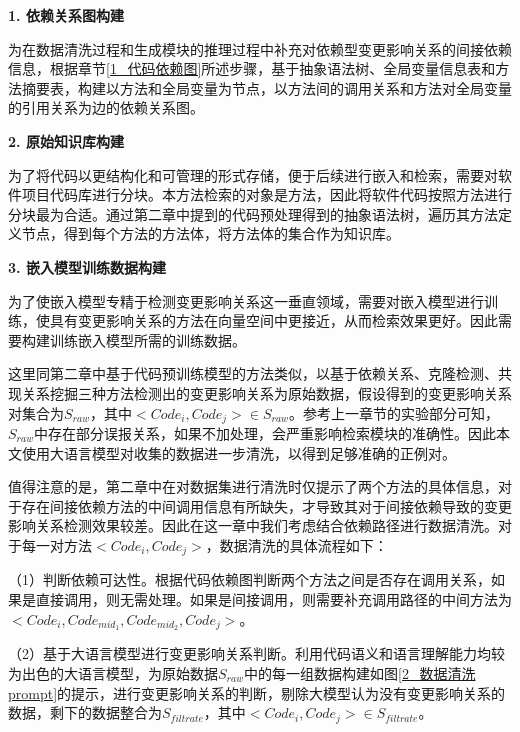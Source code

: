 \noindent \textbf{1. 依赖关系图构建}

为在数据清洗过程和生成模块的推理过程中补充对依赖型变更影响关系的间接依赖信息，根据章节\ref{1_代码依赖图}所述步骤，基于抽象语法树、全局变量信息表和方法摘要表，构建以方法和全局变量为节点，以方法间的调用关系和方法对全局变量的引用关系为边的依赖关系图。

\noindent \textbf{2. 原始知识库构建}

为了将代码以更结构化和可管理的形式存储，便于后续进行嵌入和检索，需要对软件项目代码库进行分块。本方法检索的对象是方法，因此将软件代码按照方法进行分块最为合适。通过第二章中提到的代码预处理得到的抽象语法树，遍历其方法定义节点，得到每个方法的方法体，将方法体的集合作为知识库。

\noindent \textbf{3. 嵌入模型训练数据构建}

为了使嵌入模型专精于检测变更影响关系这一垂直领域，需要对嵌入模型进行训练，使具有变更影响关系的方法在向量空间中更接近，从而检索效果更好。因此需要构建训练嵌入模型所需的训练数据。

这里同第二章中基于代码预训练模型的方法类似，以基于依赖关系、克隆检测、共现关系挖掘三种方法检测出的变更影响关系为原始数据，假设得到的变更影响关系对集合为$S_{raw}$，其中$<Code_i,Code_j>\in S_{raw}$。参考上一章节的实验部分可知，$S_{raw}$中存在部分误报关系，如果不加处理，会严重影响检索模块的准确性。因此本文使用大语言模型对收集的数据进一步清洗，以得到足够准确的正例对。

值得注意的是，第二章中在对数据集进行清洗时仅提示了两个方法的具体信息，对于存在间接依赖方法的中间调用信息有所缺失，才导致其对于间接依赖导致的变更影响关系检测效果较差。因此在这一章中我们考虑结合依赖路径进行数据清洗。对于每一对方法$<Code_i,Code_j>$，数据清洗的具体流程如下：


（1）判断依赖可达性。根据代码依赖图判断两个方法之间是否存在调用关系，如果是直接调用，则无需处理。如果是间接调用，则需要补充调用路径的中间方法为$<Code_i,Code_{mid_1},Code_{mid_2},Code_j>$。

（2）基于大语言模型进行变更影响关系判断。利用代码语义和语言理解能力均较为出色的大语言模型，为原始数据$S_{raw}$中的每一组数据构建如图\ref{2_数据清洗prompt}的提示，进行变更影响关系的判断，剔除大模型认为没有变更影响关系的数据，剩下的数据整合为$S_{filtrate}$，其中$<Code_i,Code_j>\in S_{filtrate}$。

